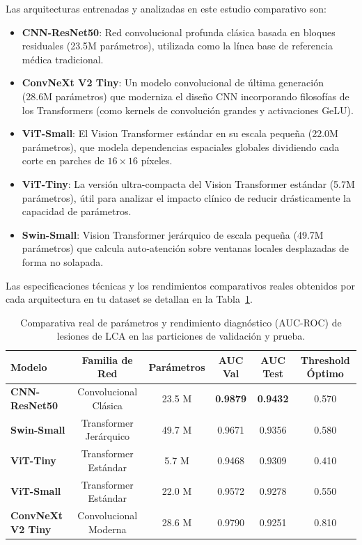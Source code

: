 Las arquitecturas entrenadas y analizadas en este estudio comparativo son:
\begin{itemize}
    \item \textbf{CNN-ResNet50}: Red convolucional profunda clásica basada en bloques residuales (23.5M parámetros), utilizada como la línea base de referencia médica tradicional.
    \item \textbf{ConvNeXt V2 Tiny}: Un modelo convolucional de última generación (28.6M parámetros) que moderniza el diseño CNN incorporando filosofías de los Transformers (como kernels de convolución grandes y activaciones GeLU).
    \item \textbf{ViT-Small}: El Vision Transformer estándar en su escala pequeña (22.0M parámetros), que modela dependencias espaciales globales dividiendo cada corte en parches de $16\times16$ píxeles.
    \item \textbf{ViT-Tiny}: La versión ultra-compacta del Vision Transformer estándar (5.7M parámetros), útil para analizar el impacto clínico de reducir drásticamente la capacidad de parámetros.
    \item \textbf{Swin-Small}: Vision Transformer jerárquico de escala pequeña (49.7M parámetros) que calcula auto-atención sobre ventanas locales desplazadas de forma no solapada.
\end{itemize}

Las especificaciones técnicas y los rendimientos comparativos reales obtenidos por cada arquitectura en tu dataset se detallan en la Tabla~\ref{tab:arquitecturas}.

\begin{table}[htbp]
\centering
\caption{Comparativa real de parámetros y rendimiento diagnóstico (AUC-ROC) de lesiones de LCA en las particiones de validación y prueba.}
\label{tab:arquitecturas}
\begin{tabular}{lccccc}
\hline
\textbf{Modelo} & \textbf{Familia de Red} & \textbf{Parámetros} & \textbf{AUC Val} & \textbf{AUC Test} & \textbf{Threshold Óptimo} \\ \hline
\textbf{CNN-ResNet50}      & Convolucional Clásica  & 23.5 M              & \textbf{0.9879}  & \textbf{0.9432}   & 0.570 \\
\textbf{Swin-Small}        & Transformer Jerárquico & 49.7 M              & 0.9671           & 0.9356            & 0.580 \\
\textbf{ViT-Tiny}          & Transformer Estándar   & 5.7 M               & 0.9468           & 0.9309            & 0.410 \\
\textbf{ViT-Small}         & Transformer Estándar   & 22.0 M              & 0.9572           & 0.9278            & 0.550 \\
\textbf{ConvNeXt V2 Tiny}  & Convolucional Moderna  & 28.6 M              & 0.9790           & 0.9251            & 0.810 \\ \hline
\end{tabular}
\end{table}

